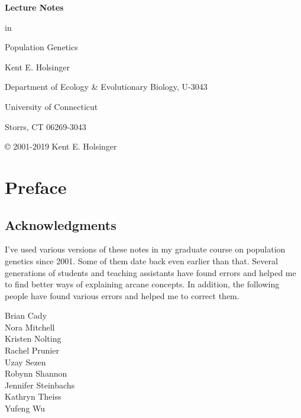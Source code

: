 \documentclass[12pt,titlepage,openright]{book}
\begin{document}
\begin{titlepage}

{\Large\bf \noindent Lecture Notes

\noindent in

\noindent Population Genetics

}

\vfill

{\noindent Kent E. Holsinger

\noindent Department of Ecology \& Evolutionary Biology, U-3043

\noindent University of Connecticut

\noindent Storrs, CT  06269-3043}

\vfill

\end{titlepage}


{\small\noindent \copyright{} 2001-2019 Kent E. Holsinger

\ccLicense}

\tableofcontents

\chapter*{Preface}

\section*{Acknowledgments}

I've used various versions of these notes in my graduate course on
population genetics
since 2001. Some of them date back even earlier than that. Several
generations of students and teaching assistants have found errors and
helped me to find better ways of explaining arcane concepts. In
addition, the following people have found various errors and helped me
to correct them.

\begin{multicols}{2}
\noindent Brian Cady \\
Nora Mitchell \\
Kristen Nolting \\
Rachel Prunier \\
Uzay Sezen \\
Robynn Shannon \\
Jennifer Steinbachs \\
Kathryn Theiss \\
Yufeng Wu \\
\end{multicols}
\end{document}
